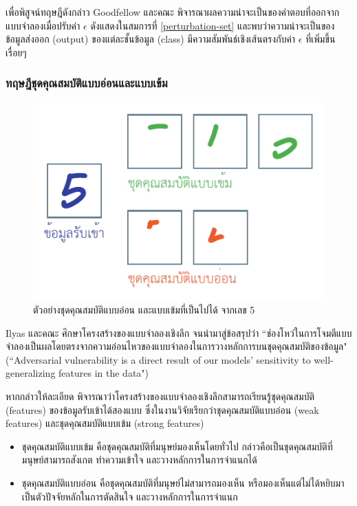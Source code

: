 \documentclass{cpepaper}
\begin{document}
เพื่อพิสูจน์ทฤษฎีดังกล่าว Goodfellow และคณะ พิจารณาผลความน่าจะเป็นของคำตอบที่ออกจากแบบจำลองเมื่อปรับค่า $\epsilon$ ดังแสดงในสมการที่ \ref{perturbation-set} และพบว่าความน่าจะเป็นของข้อมูลส่งออก (output) ของแต่ละชั้นข้อมูล (class) มีความสัมพันธ์เชิงเส้นตรงกับค่า $\epsilon$ ที่เพิ่มขึ้นเรื่อยๆ

\subsubsection{ทฤษฎีชุดคุณสมบัติแบบอ่อนและแบบเข้ม}

\begin{figure}
    \centering
    \includegraphics[width=\columnwidth]{images/strong-weak-features.pdf}
    \caption{ตัวอย่างชุดคุณสมบัติแบบอ่อน และแบบเข้มที่เป็นไปได้ จากเลข 5}
    \label{5-weak-strong}
\end{figure}

Ilyas และคณะ \cite{1905.02175} ศึกษาโครงสร้างของแบบจำลองเชิงลึก จนนำมาสู่ข้อสรุปว่า ``ช่องโหว่ในการโจมตีแบบจำลองเป็นผลโดยตรงจากความอ่อนไหวของแบบจำลองในการวางหลักการบนชุดคุณสมบัติของข้อมูล" (``Adversarial vulnerability is a direct result of our models’ sensitivity to well-generalizing features in the data")

หากกล่าวให้ละเอียด พิจารณาว่าโครงสร้างของแบบจำลองเชิงลึกสามารถเรียนรู้ชุดคุณสมบัติ (features) ของข้อมูลรับเข้าได้สองแบบ ซึ่งในงานวิจัยเรียกว่าชุดคุณสมบัติแบบอ่อน (weak features) และชุดคุณสมบัติแบบเข้ม (strong features)
\begin{itemize}
    \item ชุดคุณสมบัติแบบเข้ม คือชุดคุณสมบัติที่มนุษย์มองเห็นโดยทั่วไป กล่าวคือเป็นชุดคุณสมบัติที่มนุษย์สามารถสังเกต ทำความเข้าใจ และวางหลักการในการจำแนกได้
    \item ชุดคุณสมบัติแบบอ่อน คือชุดคุณสมบัติที่มนุษย์ไม่สามารถมองเห็น หรือมองเห็นแต่ไม่ได้หยิบมาเป็นตัวปัจจัยหลักในการตัดสินใจ และวางหลักการในการจำแนก
\end{itemize}
\end{document}
